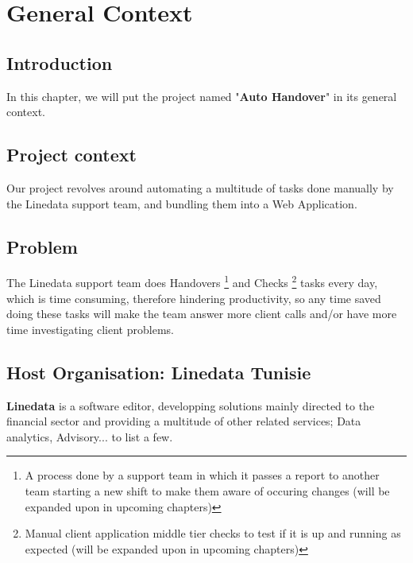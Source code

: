 \chapter{General Context}
\section*{Introduction}
In this chapter, we will put the project named "\textbf{Auto Handover}" in its general context.

\section{Project context}

Our project revolves around automating a multitude of tasks done manually by the Linedata support team, and bundling them into a Web Application.

\section{Problem}

The Linedata support team does Handovers
\footnote{A process done by a support team in which it passes a report to another team starting 
a new shift to make them aware of occuring changes (will be expanded upon in upcoming chapters)} 
and Checks
\footnote{Manual client application middle tier checks to test if it is up and running as expected (will be expanded upon in upcoming chapters)} 
tasks every day, which is time consuming, therefore hindering productivity, so any time saved doing these 
tasks will make the team answer more client calls and/or have more time investigating client problems.


\section[Host Organisation]{Host Organisation: Linedata Tunisie}
\textbf{Linedata} is a software editor, developping solutions mainly directed to the financial sector 
and providing a multitude of other related services; Data analytics, Advisory... to list a few\cite{LinedataAboutUs}.

